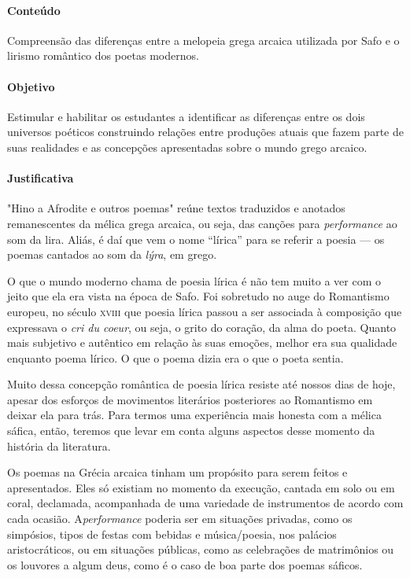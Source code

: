 \documentclass[12pt]{extarticle}
\begin{document}
\paragraph{Conteúdo} Compreensão das diferenças entre a melopeia grega arcaica
utilizada por Safo e o lirismo romântico dos poetas modernos.

\paragraph{Objetivo} Estimular e habilitar os estudantes a identificar as 
diferenças entre os dois universos poéticos construindo relações entre
produções atuais que fazem parte de suas realidades e as concepções 
apresentadas sobre o mundo grego arcaico.

\paragraph{Justificativa} "Hino a Afrodite e outros poemas" reúne textos traduzidos 
e anotados remanescentes da mélica grega arcaica, ou seja, das canções para 
\textit{performance} ao som da lira. Aliás, é daí que vem o nome ``lírica'' 
para se referir a poesia --- os poemas cantados ao som da \textit{lýra}, em grego.

O que o mundo moderno chama de poesia lírica é não tem muito a ver com
o jeito que ela era vista na época de Safo. Foi sobretudo no auge do
Romantismo europeu, no século \textsc{xviii} que poesia lírica passou a ser
associada à composição que expressava o \textit{cri du coeur}, ou seja,
o grito do coração, da alma do poeta. Quanto mais subjetivo e autêntico
em relação às suas emoções, melhor era sua qualidade enquanto poema
lírico. O que o poema dizia era o que o poeta sentia. 

Muito dessa concepção romântica de poesia lírica resiste até nossos dias
de hoje, apesar dos esforços de movimentos literários posteriores ao Romantismo
em deixar ela para trás. Para termos uma experiência mais honesta com a mélica 
sáfica, então, teremos que levar em conta alguns aspectos desse momento da 
história da literatura.

Os poemas na Grécia arcaica tinham um propósito para serem feitos e apresentados. 
Eles só existiam no momento da execução, cantada em solo ou em coral, 
declamada, acompanhada de uma variedade de instrumentos de acordo com cada ocasião. 
A\textit{performance} poderia ser em situações privadas, como os simpósios, tipos 
de festas com bebidas e música/poesia, nos palácios aristocráticos, ou em situações 
públicas, como as celebrações de matrimônios ou os louvores a algum deus, como é o
caso de boa parte dos poemas sáficos. 
\end{document}
